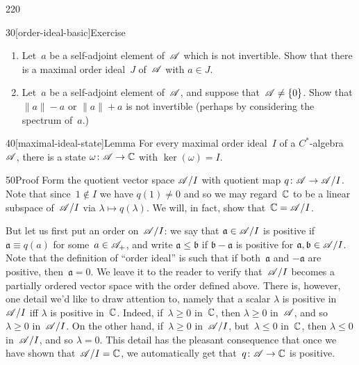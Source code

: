 \begin{parsec}{220}
\begin{point}{30}[order-ideal-basic]{Exercise}
\begin{enumerate}
Show that~$1\in (a)$ if and only if $a$ is invertible
and either $0\leq a$ or $a\leq 0$.

\item
Let~$a$ be a self-adjoint element of~$\mathscr{A}$ which
is not invertible.
Show that there is a maximal order ideal~$J$
of~$\mathscr{A}$
with $a\in J$.

\item
Let~$a$ be a self-adjoint element of~$\mathscr{A}$,
and suppose that~$\mathscr{A}\neq\{0\}$.
Show that  $\|a\|-a$
or $\|a\|+a$ is not invertible
(perhaps by considering the spectrum of~$a$.)
\end{enumerate}%
\spacingfix{}%
\end{point}%
\begin{point}{40}[maximal-ideal-state]{Lemma}%
For every maximal order ideal~$I$ of a $C^*$-algebra~$\mathscr{A}$,
 there is a state $\omega \colon \mathscr{A}\to \mathbb{C}$
with $\ker(\omega)=I$.
\begin{point}{50}{Proof}%
Form the quotient vector space $\mathscr{A}/I$
with quotient map $q\colon \mathscr{A}\to \mathscr{A}/I$.
Note that since~$1\notin I$
we have $q(1)\neq 0$
and so we may regard~$\mathbb{C}$ 
to be a linear subspace of~$\mathscr{A}/I$
via $\lambda\mapsto q(\lambda)$.
We will, in fact, show that~$\mathbb{C}=\mathscr{A}/I$.

But let us first put an order on~$\mathscr{A}/I$:
we say that $\mathfrak{a}\in \mathscr{A}/I$ is positive
if $\mathfrak{a}\equiv q(a)$ for some~$a\in\mathscr{A}_{+}$,
and write $\mathfrak{a}\leq \mathfrak{b}$ 
if $\mathfrak{b}-\mathfrak{a}$ is positive
for $\mathfrak{a},\mathfrak{b}\in\mathscr{A}/I$.
Note that the definition of ``order ideal'' is such
that if both~$\mathfrak{a}$ and $-\mathfrak{a}$ are positive,
then~$\mathfrak{a}=0$.
We leave it to the reader to verify 
that~$\mathscr{A}/I$ becomes a partially ordered vector space
with the order defined above.
There is, however,
one detail we'd like to draw attention to,
namely that a scalar $\lambda$ is positive in~$\mathscr{A}/I$
iff $\lambda$ is positive in~$\mathbb{C}$.
Indeed, if~$\lambda\geq 0$ in~$\mathbb{C}$,
then $\lambda\geq 0$ in~$\mathscr{A}$, and so~$\lambda \geq 0$ in~$\mathscr{A}/I$.
On the other hand,
if~$\lambda\geq 0$ in~$\mathscr{A}/I$, but~$\lambda\leq 0$ in~$\mathbb{C}$,
then $\lambda\leq 0$ in~$\mathscr{A}/I$,
and so $\lambda=0$.
This detail
has the pleasant consequence
that once we have shown that~$\mathscr{A}/I=\mathbb{C}$,
we automatically get that~$q\colon \mathscr{A}\to\mathbb{C}$ is positive.


\end{point}
\end{point}
\end{parsec}
